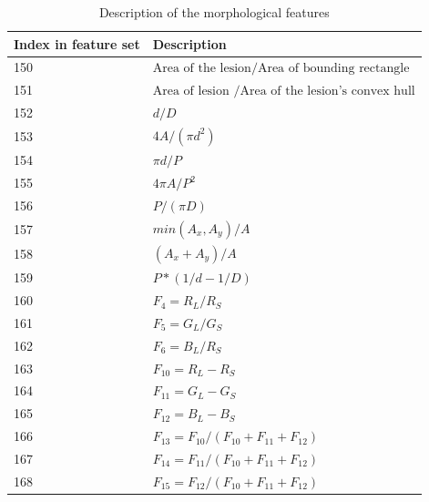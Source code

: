 \documentclass{kththesis}
\begin{document}
\begin{table}[h!]
  \caption{Description of the morphological features}
  \begin{tabular}{|l|l|}
  \hline
  Index in feature set & Description \\ \hline
  150                  &    \( \textrm{Area of the lesion} / \textrm{Area of bounding rectangle} \)        \\ \hline
  151                  &       \( \textrm{Area of lesion } / \textrm{Area of the lesion's convex hull} \)      \\ \hline
  152                  &      \(d / D\)       \\ \hline
  153                  &       \(4A/  (\pi d^2)  \)      \\ \hline
  154                  &       \(\pi d /P\)      \\ \hline
  155                  &       \(4\pi A/P^2\)      \\ \hline
  156                  &       \(P/(\pi D)\)      \\ \hline
  157                  &       \(min(A_x , A_y) /A\)      \\ \hline
  158                  &       \((A_x + A_y)/A\)      \\ \hline
  159                  &       \(P*(1/d - 1/D)\)      \\ \hline
  160                  &       \(F_4 = R_L /R_S\)      \\ \hline
  161                  &       \(F_5 = G_L / G_S\)      \\ \hline
  162                  &       \(F_6 = B_L / R_S\)      \\ \hline
  163                  &       \(F_{10} = R_L - R_S\)      \\ \hline
  164                  &       \(F_{11} = G_L - G_S\)      \\ \hline
  165                  &       \(F_{12} =B_L - B_S\)      \\ \hline
  166                  &       \(F_{13} =F_{10} / (F_{10} + F_{11} + F_{12})\)      \\ \hline
  167                  &       \(F_{14} =F_{11} / (F_{10} + F_{11} + F_{12})\)      \\ \hline
  168                  &       \(F_{15} =F_{12} / (F_{10} + F_{11} + F_{12})\)      \\ \hline
  \end{tabular}
  \label{feature_description}
\end{table}
\end{document}
